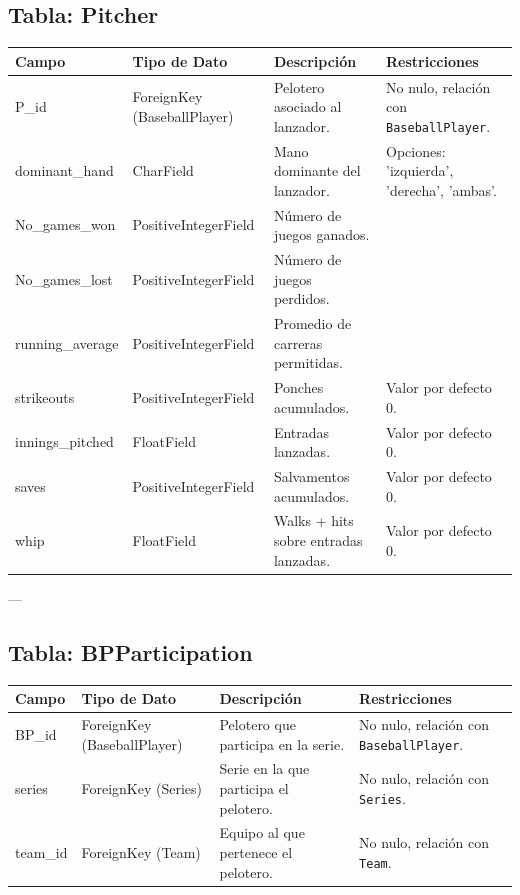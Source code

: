 \documentclass{report}
\begin{document}
    \subsection*{Tabla: Pitcher}
    \begin{tabular}{|>{\raggedright\arraybackslash}p{3cm}|>{\raggedright\arraybackslash}p{3cm}|>{\raggedright\arraybackslash}p{6cm}|>{\raggedright\arraybackslash}p{4cm}|}
        \hline
        \textbf{Campo} & \textbf{Tipo de Dato} & \textbf{Descripción} & \textbf{Restricciones} \\
        \hline
        P\_id & ForeignKey (BaseballPlayer) & Pelotero asociado al lanzador. & No nulo, relación con \texttt{BaseballPlayer}. \\
        \hline
        dominant\_hand & CharField & Mano dominante del lanzador. & Opciones: 'izquierda', 'derecha', 'ambas'. \\
        \hline
        No\_games\_won & PositiveIntegerField & Número de juegos ganados. &  \\
        \hline
        No\_games\_lost & PositiveIntegerField & Número de juegos perdidos. &  \\
        \hline
        running\_average & PositiveIntegerField & Promedio de carreras permitidas. &  \\
        \hline
        strikeouts & PositiveIntegerField & Ponches acumulados. & Valor por defecto 0. \\
        \hline
        innings\_pitched & FloatField & Entradas lanzadas. & Valor por defecto 0. \\
        \hline
        saves & PositiveIntegerField & Salvamentos acumulados. & Valor por defecto 0. \\
        \hline
        whip & FloatField & Walks + hits sobre entradas lanzadas. & Valor por defecto 0. \\
        \hline
    \end{tabular}
    
    ---
    
    \subsection*{Tabla: BPParticipation}
    \begin{tabular}{|>{\raggedright\arraybackslash}p{3cm}|>{\raggedright\arraybackslash}p{3cm}|>{\raggedright\arraybackslash}p{6cm}|>{\raggedright\arraybackslash}p{4cm}|}
        \hline
        \textbf{Campo} & \textbf{Tipo de Dato} & \textbf{Descripción} & \textbf{Restricciones} \\
        \hline
        BP\_id & ForeignKey (BaseballPlayer) & Pelotero que participa en la serie. & No nulo, relación con \texttt{BaseballPlayer}. \\
        \hline
        series & ForeignKey (Series) & Serie en la que participa el pelotero. & No nulo, relación con \texttt{Series}. \\
        \hline
        team\_id & ForeignKey (Team) & Equipo al que pertenece el pelotero. & No nulo, relación con \texttt{Team}. \\
        \hline
    \end{tabular}
    
\end{document}
